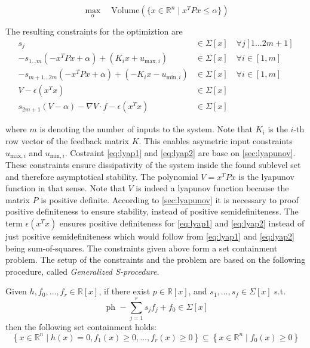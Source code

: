 \documentclass[10pt,a4paper,titlepage]{article}
\begin{document}
\begin{equation}
\label{eq:sos_problem}
\max\limits_{\alpha} \quad \text{Volume}\left(\{x \in \mathbb{R}^n \mid x^TPx \leq \alpha \}\right)
\end{equation}

The resulting constraints for the optimiztion are
\begin{align}
	s_{j} &\in \Sigma[x] \quad \forall j [1 \dots 2m+1]\\
	-s_{1 \dots m}(-x^TPx + \alpha) + (K_i x + u_{\text{max},i}) &\in \Sigma[x] \quad \forall i \in [1,m]\\
	-s_{m+1 \dots 2m}(-x^TPx + \alpha) + (-K_i x - u_{\text{min},i}) &\in \Sigma[x] \quad \forall i \in [1,m]\\
	V - \epsilon (x^Tx) &\in \Sigma[x] \label{eq:lyap1} \\
	s_{2m+1}(V-\alpha) - \nabla V \cdot f - \epsilon (x^Tx) &\in \Sigma[x] \label{eq:lyap2}
\end{align}

where $m$ is denoting the number of inputs to the system. Note that $K_i$ is the $i$-th row vector of the feedback matrix $K$. This enables
asymetric input constraints $u_{\text{max},i}$ and $u_{\text{min},i}$. Costraint \eqref{eq:lyap1} and \eqref{eq:lyap2} are base on \ref{sec:lyapunov}.
These constraints ensure dissipativity of the system inside the found sublevel set and
therefore asymptotical stability. The polynomial $V=x^TPx$ is the lyapunov function in that sense. Note that $V$ is indeed a lyapunov function because the matrix 
$P$ is positive definite. According to \ref{sec:lyapunov} it is necessary to proof positive definiteness to ensure stability, instead of
positive semidefiniteness. The term $\epsilon (x^Tx)$ ensures positive definiteness for \eqref{eq:lyap1} and \eqref{eq:lyap2} instead of just positive semidefiniteness which would follow
from \eqref{eq:lyap1} and \eqref{eq:lyap2} being sum-of-squares. The constraints given above form a set containment problem. The setup of the constraints and the problem are based on the
following procedure, called \textit{Generalized S-procedure}.

\begin{tcolorbox}[colback=gray!20, colframe=gray!80,title=Generalized S-procedure \cite{loureiro2023presentation},arc=0.2mm]        
Given $h, f_0, \ldots, f_r \in \mathbb{R}[x]$, if there exist $p \in \mathbb{R}[x]$, and $s_1, \ldots, s_f \in \Sigma[x]$ s.t.
\begin{equation}
	\text { ph }-\sum_{j=1}^r s_j f_j+f_0 \in \Sigma[x]
\end{equation}
then the following set containment holds:
\begin{equation}
	\left\{x \in \mathbb{R}^n \mid h(x)=0, f_1(x) \geq 0, \ldots, f_r(x) \geq 0\right\} \subseteq\left\{x \in \mathbb{R}^n \mid f_0(x) \geq 0\right\}
\end{equation}
\end{tcolorbox}
\end{document}
